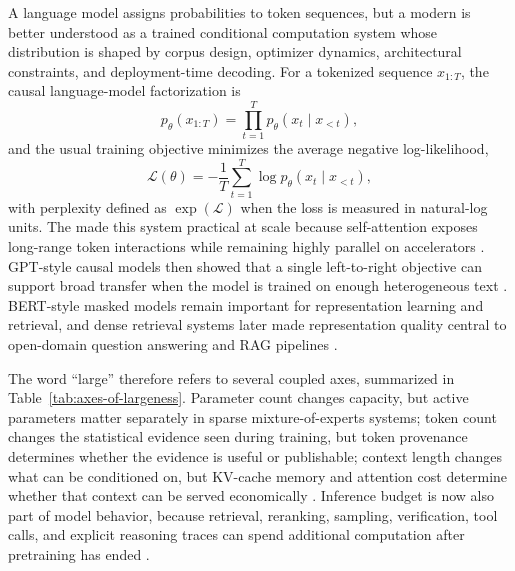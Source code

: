 A language model assigns probabilities to token sequences, but a modern \llm is better understood as a trained conditional computation system whose distribution is shaped by corpus design, optimizer dynamics, architectural constraints, and deployment-time decoding. For a tokenized sequence $x_{1:T}$, the causal language-model factorization is
\begin{equation}
  p_{\theta}(x_{1:T}) = \prod_{t=1}^{T} p_{\theta}(x_t \mid x_{<t}),
\end{equation}
and the usual training objective minimizes the average negative log-likelihood,
\begin{equation}
  \mathcal{L}(\theta) = -\frac{1}{T}\sum_{t=1}^{T}\log p_{\theta}(x_t \mid x_{<t}),
\end{equation}
with perplexity defined as $\exp(\mathcal{L})$ when the loss is measured in natural-log units. The \transformer made this system practical at scale because self-attention exposes long-range token interactions while remaining highly parallel on accelerators \cite{vaswani2017attention}. GPT-style causal models then showed that a single left-to-right objective can support broad transfer when the model is trained on enough heterogeneous text \cite{radford2019language,brown2020language}. BERT-style masked models remain important for representation learning and retrieval, and dense retrieval systems later made representation quality central to open-domain question answering and RAG pipelines \cite{devlin2018bert,karpukhin2020dense,lewis2020retrieval}.

The word ``large'' therefore refers to several coupled axes, summarized in Table~\ref{tab:axes-of-largeness}. Parameter count changes capacity, but active parameters matter separately in sparse mixture-of-experts systems; token count changes the statistical evidence seen during training, but token provenance determines whether the evidence is useful or publishable; context length changes what can be conditioned on, but KV-cache memory and attention cost determine whether that context can be served economically \cite{kaplan2020scaling,hoffmann2022training,deepseek2024v3}. Inference budget is now also part of model behavior, because retrieval, reranking, sampling, verification, tool calls, and explicit reasoning traces can spend additional computation after pretraining has ended \cite{borgeaud2022retro,lewis2020retrieval,chen2025reasoning,yang2025testtime}.

